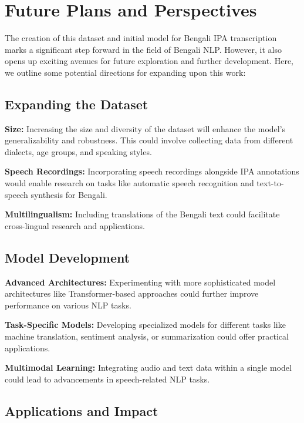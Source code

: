 \chapter{Future Plans and Perspectives}

The creation of this dataset and initial model for Bengali IPA transcription marks a significant step forward in the field of Bengali NLP. However, it also opens up exciting avenues for future exploration and further development. Here, we outline some potential directions for expanding upon this work:


\section{Expanding the Dataset}

\hspace{0.5cm}\textbf{Size:} Increasing the size and diversity of the dataset will enhance the model's generalizability and robustness. This could involve collecting data from different dialects, age groups, and speaking styles.

\textbf{Speech Recordings:} Incorporating speech recordings alongside IPA annotations would enable research on tasks like automatic speech recognition and text-to-speech synthesis for Bengali.

\textbf{Multilingualism:} Including translations of the Bengali text could facilitate cross-lingual research and applications.

\section{Model Development}

\hspace{0.5cm}\textbf{Advanced Architectures:} Experimenting with more sophisticated model architectures like Transformer-based approaches could further improve performance on various NLP tasks.

\textbf{Task-Specific Models:} Developing specialized models for different tasks like machine translation, sentiment analysis, or summarization could offer practical applications.

\textbf{Multimodal Learning:} Integrating audio and text data within a single model could lead to advancements in speech-related NLP tasks.

\section{Applications and Impact}

